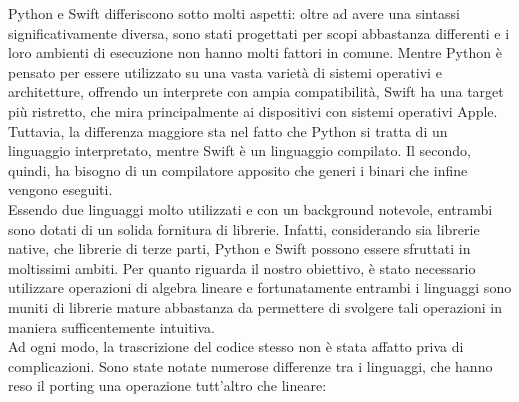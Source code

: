 Python e Swift differiscono sotto molti aspetti: oltre ad avere una sintassi
significativamente diversa, sono stati progettati per scopi abbastanza 
differenti e i loro ambienti di esecuzione non hanno molti fattori 
in comune. Mentre Python è pensato per essere utilizzato su una vasta
varietà di sistemi operativi e architetture, offrendo un interprete
con ampia compatibilità, Swift ha una target più ristretto, che 
mira principalmente ai dispositivi con sistemi operativi Apple.
Tuttavia, la differenza maggiore sta nel fatto che Python si tratta
di un linguaggio interpretato, mentre Swift è un linguaggio compilato. 
Il secondo, quindi, ha bisogno di un compilatore apposito che generi
i binari che infine vengono eseguiti.\\
Essendo due linguaggi molto utilizzati e con un background notevole,
entrambi sono dotati di un solida fornitura di librerie. Infatti, 
considerando sia librerie native, che librerie di terze parti,
Python e Swift possono essere sfruttati in moltissimi ambiti.
Per quanto riguarda il nostro obiettivo, è stato necessario
utilizzare operazioni di algebra lineare e fortunatamente entrambi i
linguaggi sono muniti di librerie mature abbastanza da permettere di 
svolgere tali operazioni in maniera sufficentemente intuitiva.\\
Ad ogni modo, la trascrizione del codice stesso non è stata affatto
priva di complicazioni. Sono state notate numerose differenze tra i
linguaggi, che hanno reso il porting una operazione tutt'altro che 
lineare:
